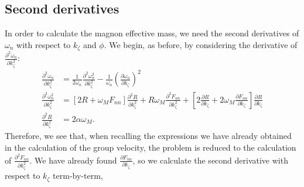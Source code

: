 \documentclass{article}
\begin{document}
\subsection{Second derivatives}
In order to calculate the magnon effective mass, we need the second derivatives of $\omega_{n}$ with respect to $k_{\zeta}$ and $\phi$. We begin, as before, by considering the derivative of $\frac{\partial^2 \omega_{n}}{\partial k_{\zeta}^2}$:
\begin{align}
\frac{\partial^2 \omega_{n}}{\partial k_{\zeta}^2} &= \frac{1}{2 \omega_{n}} \frac{\partial^2 \omega_{n}^2}{\partial k_{\zeta}^2} - \frac{1}{\omega_{n}} \left(\frac{\partial \omega_{n}}{\partial k_{\zeta}}\right)^2 \\
\frac{\partial^2 \omega_{n}^2}{\partial k_{\zeta}^2} &= \left[2R + \omega_{M} F_{nn} \right] \frac{\partial^2 R}{\partial k_{\zeta}^2} + R \omega_{M} \frac{\partial^2 F_{nn}}{\partial k_{\zeta}^2} + \left[ 2 \frac{\partial R}{\partial k_{\zeta}} + 2 \omega_{M} \frac{\partial F_{nn}}{\partial k_{\zeta}} \right] \frac{\partial R}{\partial k_{\zeta}} \\
\frac{\partial^2 R}{\partial k_{\zeta}^2} &= 2 \alpha \omega_{M}.
\end{align}
Therefore, we see that, when recalling the expressions we have already obtained in the calculation of the group velocity, the problem is reduced to the calculation of $\frac{\partial^2 F_{nn}}{\partial k_{\zeta}^2}$. We have already found $\frac{\partial F_{nn}}{\partial k_{\zeta}}$, so we calculate the second derivative with respect to $k_{\zeta}$ term-by-term,
\end{document}
